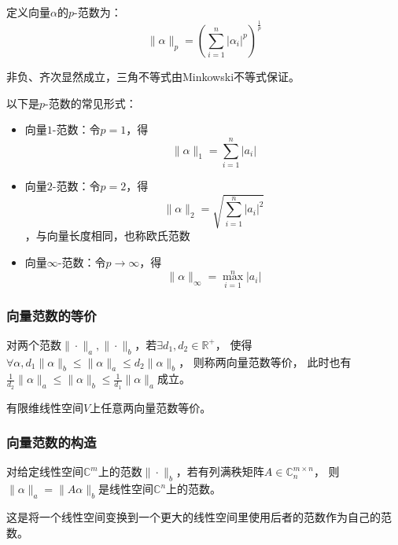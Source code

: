 \begin{definition}[$p$-范数]
    定义向量$\alpha$的$p$-范数为：
    \[
        \|\alpha\|_p=(\sum_{i=1}^n |\alpha_i|^p)^{\frac{1}{p}}
    \]
\end{definition}
非负、齐次显然成立，三角不等式由Minkowski不等式保证。

\begin{definition}[$1$-范数~$2$-范数~$\infty$-范数]
    以下是$p$-范数的常见形式：
    \begin{itemize}
        \item 向量$1$-范数：令$p=1$，得
        \[
            \|\alpha\|_1= \sum_{i=1}^n |a_i|
        \]
        \item 向量$2$-范数：令$p=2$，得
        \[
            \|\alpha\|_2= \sqrt{\sum_{i=1}^n |a_i|^2}
        \]
        ，与向量长度相同，也称欧氏范数
        \item 向量$\infty$-范数：令$p\to\infty$，得
        \[
            \|\alpha\|_\infty= \max_{i=1}^n |a_i|
        \]
    \end{itemize}
\end{definition}

\subsubsection{向量范数的等价}

\begin{definition}[向量范数的等价]
    对两个范数$\|\cdot\|_a,\|\cdot\|_b$，若$\exists d_1,d_2\in \mathbb{R}^{+}$，
    使得$\forall \alpha, d_1 \|\alpha\|_b \leq \|\alpha\|_a \leq d_2 \|\alpha\|_b$，
    则称两向量范数等价，
    此时也有$\frac{1}{d_2} \|\alpha\|_a \leq \|\alpha\|_b \leq \frac{1}{d_1} \|\alpha\|_a$成立。
\end{definition}

\begin{theorem}
    有限维线性空间$V$上任意两向量范数等价。
\end{theorem}

\subsubsection{向量范数的构造}

\begin{theorem}
    对给定线性空间$\mathbb{C}^m$上的范数$\|\cdot\|_b$，若有列满秩矩阵$A\in \mathbb{C}^{m\times n}_n$，
    则$\|\alpha\|_a=\|A\alpha\|_b$是线性空间$\mathbb{C}^n$上的范数。
\end{theorem}
这是将一个线性空间变换到一个更大的线性空间里使用后者的范数作为自己的范数。

